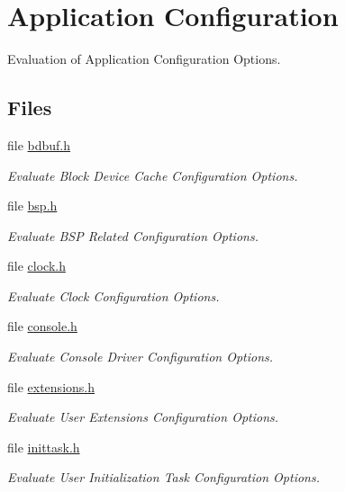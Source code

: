 \hypertarget{group__RTEMSApplicationConfiguration}{}\section{Application Configuration}
\label{group__RTEMSApplicationConfiguration}


Evaluation of Application Configuration Options.  


\subsection*{Files}
\begin{DoxyCompactItemize}
\item 
file \mbox{\hyperlink{confdefs_2bdbuf_8h}{bdbuf.\+h}}
\begin{DoxyCompactList}\small\item\em Evaluate Block Device Cache Configuration Options. \end{DoxyCompactList}\item 
file \mbox{\hyperlink{cpukit_2include_2rtems_2confdefs_2bsp_8h}{bsp.\+h}}
\begin{DoxyCompactList}\small\item\em Evaluate B\+SP Related Configuration Options. \end{DoxyCompactList}\item 
file \mbox{\hyperlink{cpukit_2include_2rtems_2confdefs_2clock_8h}{clock.\+h}}
\begin{DoxyCompactList}\small\item\em Evaluate Clock Configuration Options. \end{DoxyCompactList}\item 
file \mbox{\hyperlink{cpukit_2include_2rtems_2confdefs_2console_8h}{console.\+h}}
\begin{DoxyCompactList}\small\item\em Evaluate Console Driver Configuration Options. \end{DoxyCompactList}\item 
file \mbox{\hyperlink{extensions_8h}{extensions.\+h}}
\begin{DoxyCompactList}\small\item\em Evaluate User Extensions Configuration Options. \end{DoxyCompactList}\item 
file \mbox{\hyperlink{inittask_8h}{inittask.\+h}}
\begin{DoxyCompactList}\small\item\em Evaluate User Initialization Task Configuration Options. \end{DoxyCompactList}\item 

\end{DoxyCompactItemize}
